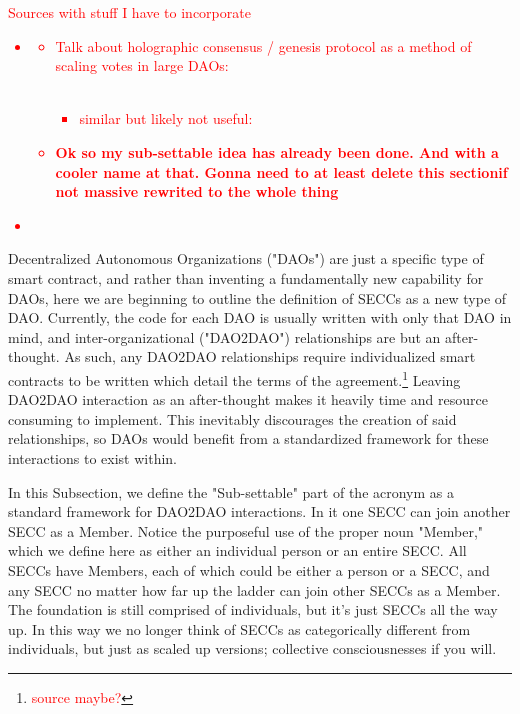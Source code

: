 \documentclass{article}[10pt]
\begin{document}
\textcolor{red}{Sources with stuff I have to incorporate}
\textcolor{red}{\begin{itemize}
    \item {}
    \begin{itemize}
        \item Talk about holographic consensus / genesis protocol as a method of scaling votes in large DAOs: \\ \\
        \begin{itemize}
            \item similar but likely not useful:\\
        \end{itemize}
        \item \textbf{Ok so my sub-settable idea has already been done.
        And with a cooler name at that.
        Gonna need to at least delete this sectionif not massive rewrited to the whole thing}\\
    \end{itemize}
    \item 
\end{itemize}}

Decentralized Autonomous Organizations ("DAOs") are just a specific type of smart contract, and rather than inventing a fundamentally new capability for DAOs, here we are beginning to outline the definition of SECCs as a new type of DAO.
Currently, the code for each DAO is usually written with only that DAO in mind, and inter-organizational ("DAO2DAO") relationships are but an after-thought.
As such, any DAO2DAO relationships require individualized smart contracts to be written which detail the terms of the agreement.\footnote{
    \textcolor{red}{source maybe?}}
Leaving DAO2DAO interaction as an after-thought makes it heavily time and resource consuming to implement.
This inevitably discourages the creation of said relationships, so DAOs would benefit from a standardized framework for these interactions to exist within.\par 

In this Subsection, we define the "Sub-settable" part of the acronym as a standard framework for DAO2DAO interactions.
In it one SECC can join another SECC as a Member.
Notice the purposeful use of the proper noun "Member," which we define here as either an individual person or an entire SECC.
All SECCs have Members, each of which could be either a person or a SECC, and any SECC no matter how far up the ladder can join other SECCs as a Member.
The foundation is still comprised of individuals, but it's just SECCs all the way up.
In this way we no longer think of SECCs as categorically different from individuals, but just as scaled up versions; collective consciousnesses if you will. \par
\end{document}
